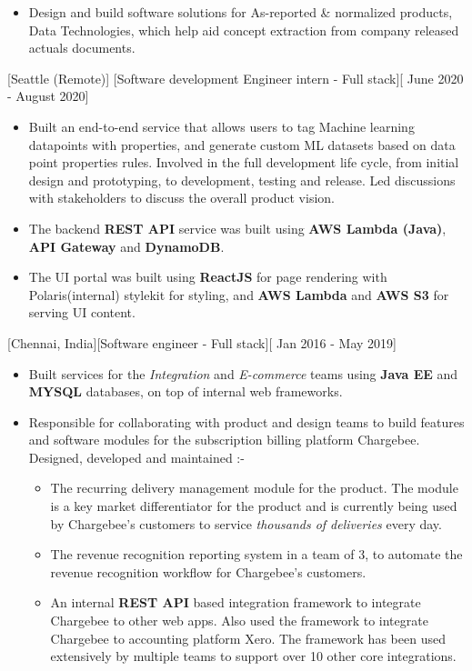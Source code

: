 \documentclass{article}
\begin{document}
\begin{itemize}
\item Design and build software solutions for As-reported \& normalized products, Data Technologies, which help aid concept extraction from company released actuals documents.
\end{itemize}

[\normalfont{}Seattle (Remote)]
[Software development Engineer intern - Full stack][\normalfont{} June 2020 - August 2020]
\vspace{0.25cm}
\begin{itemize}
\item Built an end-to-end service that allows users to tag Machine learning datapoints with properties, and generate custom ML datasets based 
on data point properties rules. Involved in the full development life cycle, from initial design and prototyping, to development, testing and release. 
Led discussions with stakeholders to discuss the overall product vision.
\item The backend \textbf{REST API} service was built using \textbf{AWS Lambda (Java)}, \textbf{API Gateway} and \textbf{DynamoDB}.
\item The UI portal was built using \textbf{ReactJS} for page rendering with Polaris(internal) stylekit for styling, and \textbf{AWS Lambda} 
and \textbf{AWS S3} for serving UI content.
\end{itemize}

[\normalfont{}Chennai, India][Software engineer - Full stack][\normalfont{} Jan 2016 - May 2019]
\vspace{0.25cm}
\begin{itemize}
\item Built services for the  \emph{Integration} and \emph{E-commerce} teams using \textbf{Java EE} and \textbf{MYSQL} databases, 
on top of internal web frameworks.
\item Responsible for collaborating with product and design teams to build features 
and software modules for the subscription billing platform Chargebee. Designed, developed and maintained :-
\begin{itemize}
\item The recurring delivery management module for the product. The module is a key market differentiator for the product and is currently being used by Chargebee’s customers to 
service \emph{thousands of deliveries} every day.
\item The revenue recognition reporting system in a team of 3, to automate the revenue recognition workflow for 
Chargebee’s customers.
\item An internal \textbf{REST API} based integration framework to integrate Chargebee to other web apps. Also used the framework to integrate 
Chargebee to accounting platform Xero. The framework has been used extensively by multiple teams to support over 10 other core integrations.
\end{itemize}
\end{itemize}
\end{document}
